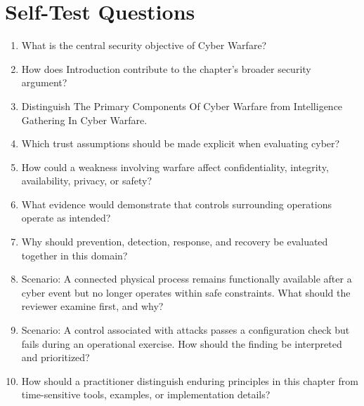 \documentclass[11pt]{article}
\begin{document}
\section*{Self-Test Questions}
\begin{enumerate}
\item What is the central security objective of Cyber Warfare?
\item How does Introduction contribute to the chapter's broader security argument?
\item Distinguish The Primary Components Of Cyber Warfare from Intelligence Gathering In Cyber Warfare.
\item Which trust assumptions should be made explicit when evaluating cyber?
\item How could a weakness involving warfare affect confidentiality, integrity, availability, privacy, or safety?
\item What evidence would demonstrate that controls surrounding operations operate as intended?
\item Why should prevention, detection, response, and recovery be evaluated together in this domain?
\item Scenario: A connected physical process remains functionally available after a cyber event but no longer operates within safe constraints. What should the reviewer examine first, and why?
\item Scenario: A control associated with attacks passes a configuration check but fails during an operational exercise. How should the finding be interpreted and prioritized?
\item How should a practitioner distinguish enduring principles in this chapter from time-sensitive tools, examples, or implementation details?
\end{enumerate}
\end{document}
